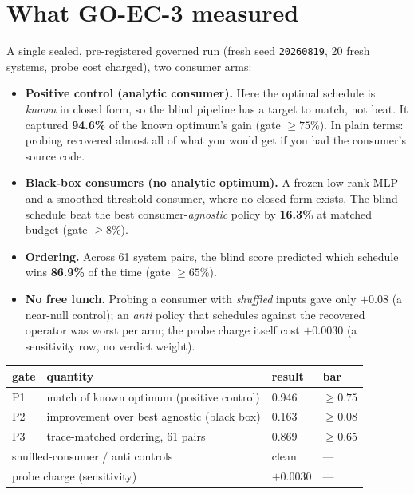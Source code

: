 \documentclass[11pt]{article}
\begin{document}
\section*{What GO-EC-3 measured}

A single sealed, pre-registered governed run (fresh seed \texttt{20260819},
20 fresh systems, probe cost charged), two consumer arms:

\begin{itemize}
\item \textbf{Positive control (analytic consumer).} Here the optimal
schedule is \emph{known} in closed form, so the blind pipeline has a
target to match, not beat. It captured \textbf{94.6\%} of the known
optimum's gain (gate $\ge 75\%$). In plain terms: probing recovered
almost all of what you would get if you had the consumer's source code.
\item \textbf{Black-box consumers (no analytic optimum).} A frozen
low-rank MLP and a smoothed-threshold consumer, where no closed form
exists. The blind schedule beat the best consumer-\emph{agnostic} policy
by \textbf{16.3\%} at matched budget (gate $\ge 8\%$).
\item \textbf{Ordering.} Across 61 system pairs, the blind score
predicted which schedule wins \textbf{86.9\%} of the time (gate
$\ge 65\%$).
\item \textbf{No free lunch.} Probing a consumer with \emph{shuffled}
inputs gave only $+0.08$ (a near-null control); an \emph{anti} policy
that schedules against the recovered operator was worst per arm; the
probe charge itself cost $+0.0030$ (a sensitivity row, no verdict
weight).
\end{itemize}

\begin{center}
\small
\begin{tabular}{llll}
\toprule
gate & quantity & result & bar \\
\midrule
P1 & match of known optimum (positive control) & 0.946 & $\ge 0.75$ \\
P2 & improvement over best agnostic (black box) & 0.163 & $\ge 0.08$ \\
P3 & trace-matched ordering, 61 pairs & 0.869 & $\ge 0.65$ \\
\multicolumn{2}{l}{shuffled-consumer / anti controls} & clean & --- \\
\multicolumn{2}{l}{probe charge (sensitivity)} & $+0.0030$ & --- \\
\bottomrule
\end{tabular}
\end{center}
\end{document}
